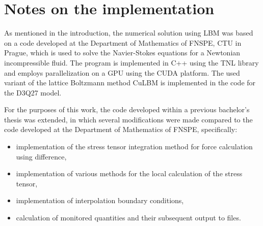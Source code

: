 \section{Notes on the implementation}\label{notes on the LBM implementation}
As mentioned in the introduction, the numerical solution using LBM was based on a code developed at the Department of Mathematics of FNSPE, CTU in Prague, which is used to solve the Navier-Stokes equations for a Newtonian incompressible fluid. The program is implemented in C++ using the TNL library \cite{Oberhuber2021, Klinkovsky2022} and employs parallelization on a GPU using the CUDA platform. The used variant of the lattice Boltzmann method CuLBM is implemented in the code for the D3Q27 model.

For the purposes of this work, the code developed within a previous bachelor's thesis \cite{JB} was extended, in which several modifications were made compared to the code developed at the Department of Mathematics of FNSPE, specifically:
\begin{itemize}
	\item implementation of the stress tensor integration method for force calculation using difference,
	\item implementation of various methods for the local calculation of the stress tensor,
	\item implementation of interpolation boundary conditions,
	\item calculation of monitored quantities and their subsequent output to files.
\end{itemize}
